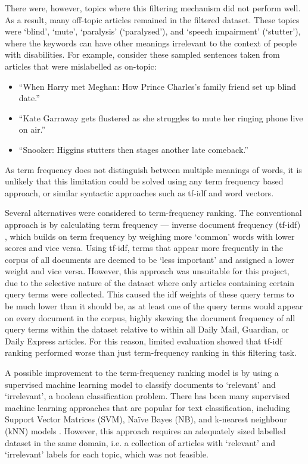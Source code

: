 \documentclass{report}
\begin{document}
There were, however, topics where this filtering mechanism did not perform well.
As a result, many off-topic articles remained in the filtered dataset.
These topics were `blind', `mute', `paralysis' (`paralysed'), and `speech impairment' (`stutter'), where the keywords can have other meanings irrelevant to the context of people with disabilities.
For example, consider these sampled sentences taken from articles that were mislabelled as on-topic:
\begin{itemize}
	\item ``When Harry met Meghan: How Prince Charles's family friend set up blind date.''
	\item ``Kate Garraway gets flustered as she struggles to mute her ringing phone live on air.''
	\item ``Snooker: Higgins stutters then stages another late comeback.''
\end{itemize}

As term frequency does not distinguish between multiple meanings of words, it is unlikely that this limitation could be solved using any term frequency based approach, or similar syntactic approaches such as tf-idf and word vectors.

Several alternatives were considered to term-frequency ranking.
The conventional approach is by calculating term frequency --- inverse document frequency (tf-idf) \cite{robertson2004understanding, sparck1972statistical}, which builds on term frequency by weighing more `common' words with lower scores and vice versa.
Using tf-idf, terms that appear more frequently in the corpus of all documents are deemed to be `less important' and assigned a lower weight and vice versa.
However, this approach was unsuitable for this project, due to the selective nature of the dataset where only articles containing certain query terms were collected. 
This caused the idf weights of these query terms to be much lower than it should be, as at least one of the query terms would appear on every document in the corpus, highly skewing the document frequency of all query terms within the dataset relative to within all Daily Mail, Guardian, or Daily Express articles.
For this reason, limited evaluation showed that tf-idf ranking performed worse than just term-frequency ranking in this filtering task.

A possible improvement to the term-frequency ranking model is by using a supervised machine learning model to classify documents to `relevant' and `irrelevant', a boolean classification problem.
There has been many supervised machine learning approaches that are popular for text classification, including Support Vector Matrices (SVM), Na\"{i}ve Bayes (NB), and k-nearest neighbour (kNN) models \cite{khan2010review}.
However, this approach requires an adequately sized labelled dataset in the same domain, i.e. a collection of articles with `relevant' and `irrelevant' labels for each topic, which was not feasible.
\end{document}
